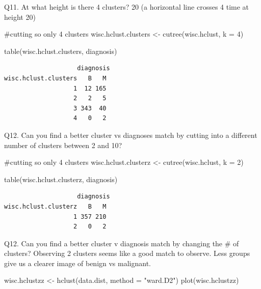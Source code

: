 \documentclass[
  letterpaper,
  DIV=11,
  numbers=noendperiod]{scrartcl}
\newenvironment{Shaded}{\begin{snugshade}}{\end{snugshade}}
\newcommand{\AttributeTok}[1]{\textcolor[rgb]{0.40,0.45,0.13}{#1}}
\newcommand{\CommentTok}[1]{\textcolor[rgb]{0.37,0.37,0.37}{#1}}
\newcommand{\DecValTok}[1]{\textcolor[rgb]{0.68,0.00,0.00}{#1}}
\newcommand{\FunctionTok}[1]{\textcolor[rgb]{0.28,0.35,0.67}{#1}}
\newcommand{\NormalTok}[1]{\textcolor[rgb]{0.00,0.23,0.31}{#1}}
\newcommand{\OtherTok}[1]{\textcolor[rgb]{0.00,0.23,0.31}{#1}}
\newcommand{\StringTok}[1]{\textcolor[rgb]{0.13,0.47,0.30}{#1}}
\begin{document}
Q11. At what height is there 4 clusters? 20 (a horizontal line crosses 4
time at height 20)

\begin{Shaded}
\begin{Highlighting}[]
\CommentTok{\#cutting so only 4 clusters}
\NormalTok{wisc.hclust.clusters }\OtherTok{\textless{}{-}} \FunctionTok{cutree}\NormalTok{(wisc.hclust, }\AttributeTok{k =} \DecValTok{4}\NormalTok{)}

\FunctionTok{table}\NormalTok{(wisc.hclust.clusters, diagnosis)}
\end{Highlighting}
\end{Shaded}

\begin{verbatim}
                    diagnosis
wisc.hclust.clusters   B   M
                   1  12 165
                   2   2   5
                   3 343  40
                   4   0   2
\end{verbatim}

Q12. Can you find a better cluster vs diagnoses match by cutting into a
different number of clusters between 2 and 10?

\begin{Shaded}
\begin{Highlighting}[]
\CommentTok{\#cutting so only 4 clusters}
\NormalTok{wisc.hclust.clusterz }\OtherTok{\textless{}{-}} \FunctionTok{cutree}\NormalTok{(wisc.hclust, }\AttributeTok{k =} \DecValTok{2}\NormalTok{)}

\FunctionTok{table}\NormalTok{(wisc.hclust.clusterz, diagnosis)}
\end{Highlighting}
\end{Shaded}

\begin{verbatim}
                    diagnosis
wisc.hclust.clusterz   B   M
                   1 357 210
                   2   0   2
\end{verbatim}

Q12. Can you find a better cluster v diagnosis match by changing the \#
of clusters? Observing 2 clusters seems like a good match to observe.
Less groups give us a clearer image of benign vs malignant.

\begin{Shaded}
\begin{Highlighting}[]
\NormalTok{wisc.hclustzz }\OtherTok{\textless{}{-}} \FunctionTok{hclust}\NormalTok{(data.dist, }\AttributeTok{method =} \StringTok{"ward.D2"}\NormalTok{)}
\FunctionTok{plot}\NormalTok{(wisc.hclustzz)}
\end{Highlighting}
\end{Shaded}
\end{document}
